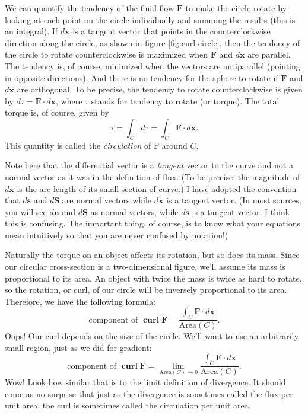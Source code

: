 \documentclass{myarticle}
\DeclareMathOperator{\curl}{\mathbf{curl}}
\renewcommand{\vec}[1]{\mathbf{#1}}
\theoremstyle{nospace}
\newtheorem{old series theorem}{Theorem}
\newenvironment{series theorem}
{\begin{mdframed}\begin{old series theorem}}
    {\end{old series theorem}\end{mdframed}}
\begin{document}
We can quantify the tendency of the fluid flow $\vec{F}$ to make the
circle rotate by looking at each point on the circle individually and
summing the results (this is an integral). If $d\vec{x}$ is a tangent
vector that points in the counterclockwise direction along the circle,
as shown in figure \ref{fig:curl circle}, then the tendency of the
circle to rotate counterclockwise is maximized when $\vec{F}$ and
$d\vec{x}$ are parallel. The tendency is, of course, minimized when
the vectors are antiparallel (pointing in opposite directions). And
there is no tendency for the sphere to rotate if $\vec{F}$ and
$d\vec{x}$ are orthogonal. To be precise, the tendency to rotate
counterclockwise is given by $d\tau = \vec{F} \cdot d\vec{x}$, where
$\tau$ stands for tendency to rotate (or torque). The total torque is,
of course, given by
\[
  \tau = \int_C d\tau = \int_C \vec{F} \cdot d\vec{x}.
\]
This quantity is called the \textit{circulation} of $\text{F}$ around
$C$.

Note here that the differential vector is a \textit{tangent} vector to
the curve and not a normal vector as it was in the definition of flux.
(To be precise, the magnitude of $d\vec{x}$ is the arc length of its
small section of curve.) I have adopted the convention that $d\vec{s}$
and $d\vec{S}$ are normal vectors while $d\vec{x}$ is a tangent
vector. (In most sources, you will see $d\vec{n}$ and $d\vec{S}$ as
normal vectors, while $d\vec{s}$ is a tangent vector. I think this is
confusing. The important thing, of course, is to know what your
equations mean intuitively so that you are never confused by
notation!)

Naturally the torque on an object affects its rotation, but so does
its mass. Since our circular cross-section is a two-dimensional
figure, we'll assume its mass is proportional to its area. An object
with twice the mass is twice as hard to rotate, so the rotation, or
curl, of our circle will be inversely proportional to its area.
Therefore, we have the following formula:
\[
  \text{component of }\curl \vec{F}
  = \frac{\int_C \vec{F} \cdot d\vec{x}}{\text{Area}(C)}.
\]
Oops! Our curl depends on the size of the circle. We'll want to use an
arbitrarily small region, just as we did for gradient:
\[
  \text{component of }\curl \vec{F}
  = \lim_{\text{Area}(C) \to 0}
  \frac{\int_C \vec{F} \cdot d\vec{x}}{\text{Area}(C)}.
\]
Wow! Look how similar that is to the limit definition of divergence.
It should come as no surprise that just as the divergence is sometimes
called the flux per unit area, the curl is sometimes called the
circulation per unit area.
\end{document}
